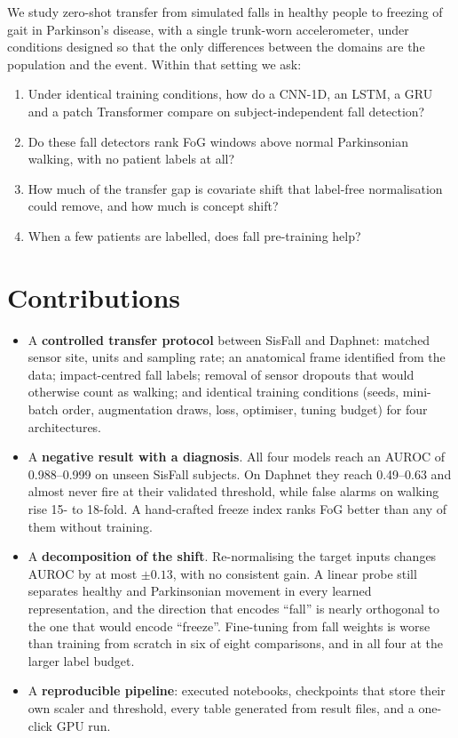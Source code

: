 We study zero-shot transfer from simulated falls in healthy people to freezing of gait in
Parkinson's disease, with a single trunk-worn accelerometer, under conditions designed so that the
only differences between the domains are the population and the event. Within that setting we ask:
\begin{enumerate}
  \item[\textbf{RQ1}] Under identical training conditions, how do a CNN-1D, an LSTM, a GRU and a patch
  Transformer compare on subject-independent fall detection?
  \item[\textbf{RQ2}] Do these fall detectors rank FoG windows above normal Parkinsonian walking, with no
  patient labels at all?
  \item[\textbf{RQ3}] How much of the transfer gap is covariate shift that label-free normalisation could
  remove, and how much is concept shift?
  \item[\textbf{RQ4}] When a few patients are labelled, does fall pre-training help?
\end{enumerate}

\section{Contributions}

\begin{itemize}
  \item A \textbf{controlled transfer protocol} between SisFall and Daphnet: matched sensor site, units and
  sampling rate; an anatomical frame identified from the data; impact-centred fall labels; removal of
  sensor dropouts that would otherwise count as walking; and identical training conditions
  (seeds, mini-batch order, augmentation draws, loss, optimiser, tuning budget) for four architectures.
  \item A \textbf{negative result with a diagnosis}. All four models reach an AUROC of 0.988--0.999 on unseen
  SisFall subjects. On Daphnet they reach 0.49--0.63 and almost never fire at their validated
  threshold, while false alarms on walking rise 15- to 18-fold. A hand-crafted freeze index ranks FoG
  better than any of them without training.
  \item A \textbf{decomposition of the shift}. Re-normalising the target inputs changes AUROC by at most
  $\pm0.13$, with no consistent gain. A linear probe still separates healthy and Parkinsonian movement
  in every learned representation, and the direction that encodes ``fall'' is nearly orthogonal to the
  one that would encode ``freeze''. Fine-tuning from fall weights is worse than training from scratch
  in six of eight comparisons, and in all four at the larger label budget.
  \item A \textbf{reproducible pipeline}: executed notebooks, checkpoints that store their own scaler and
  threshold, every table generated from result files, and a one-click GPU run.
\end{itemize}

